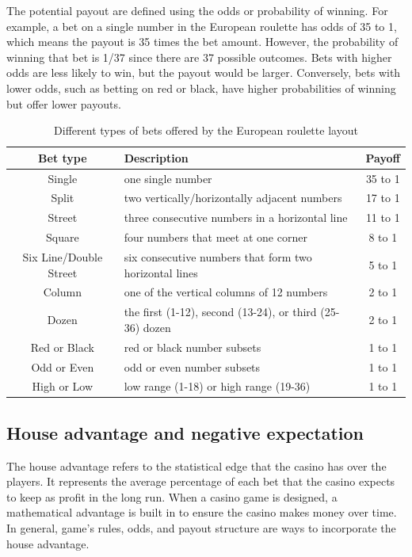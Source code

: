 \documentclass[11pt,twoside]{article}
\numberwithin{Theorem}{section}
\numberwithin{Definition}{section}
\numberwithin{Lemma}{section}
\numberwithin{Algorithm}{section}
\numberwithin{equation}{section}
\begin{document}
The potential payout are defined using the odds or probability of winning. For example, a bet on a single number in the European roulette has odds of 35 to 1, which means the payout is 35 times the bet amount. However, the probability of winning that bet is 1/37 since there are 37 possible outcomes. Bets with higher odds are less likely to win, but the payout would be larger. Conversely, bets with lower odds, such as betting on red or black, have higher probabilities of winning but offer lower payouts. 
\begin{table}[!ht]
\centering
\caption{Different types of bets offered by the European roulette layout}
\begin{tabular}{|c|l|c|}
\hline
Bet type & Description & Payoff\\
\hline\hline
Single & one single number & 35 to 1\\
Split  & two vertically/horizontally adjacent numbers & 17 to 1\\
Street & three consecutive numbers in a horizontal line & 11 to 1\\
Square & four numbers that meet at one corner & 8 to 1\\
Six Line/Double Street & six consecutive numbers that form two horizontal lines & 5 to 1\\
Column &  one of the vertical columns of 12 numbers & 2 to 1\\
Dozen & the first (1-12),  second (13-24), or third (25-36) dozen &2 to 1\\
Red or Black & red or black number subsets& 1 to 1\\
Odd or Even & odd or even number subsets & 1 to 1\\
High or Low & low range (1-18) or high range (19-36) & 1 to 1\\
\hline
\end{tabular}
\label{bet_types}
\end{table}

\subsection{House advantage and negative expectation}
The house advantage refers to the statistical edge that the casino has over the players.  It represents the average percentage of each bet that the casino expects to keep as profit in the long run. When a casino game is designed, a mathematical advantage is built in to ensure the casino makes money over time. In general, game's rules, odds, and payout structure are ways to incorporate the house advantage.   
\end{document}
